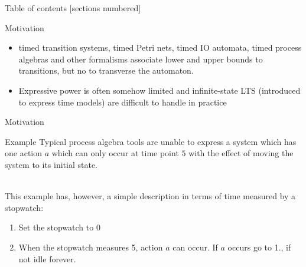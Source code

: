 \documentclass[aspectratio=169]{beamer}
\begin{document}
\begin{frame}{Table of contents}
  [sections numbered]
  \tableofcontents[hideallsubsections]
\end{frame}


\begin{slide}{Motivation}
\small

\begin{itemize}
\item \alert{timed transition systems}, \alert{timed Petri nets}, \alert{timed IO automata}, \alert{timed process algebras} and other formalisms associate lower and upper bounds to transitions, but no  to transverse the automaton.
\item Expressive power is often somehow limited and \alert{infinite}-state LTS (introduced to express  time models) are 
difficult to handle in practice
\end{itemize}
\end{slide}


\begin{slide}{Motivation}
\small

\begin{block}{Example}
Typical process algebra tools %
are unable to express a \alert{system which has one action $a$ which can only occur at time point $5$
with the effect of moving the system to its initial state.}
\end{block}
~\\

This example has, however, a simple description in terms of time measured by a \alert{stopwatch}:
\begin{enumerate}
\item Set the stopwatch to 0
\item When the stopwatch measures 5, action $a$ can occur. If $a$ occurs go to 1., if not idle forever.
\end{enumerate}

~\\
\end{slide}
\end{document}
